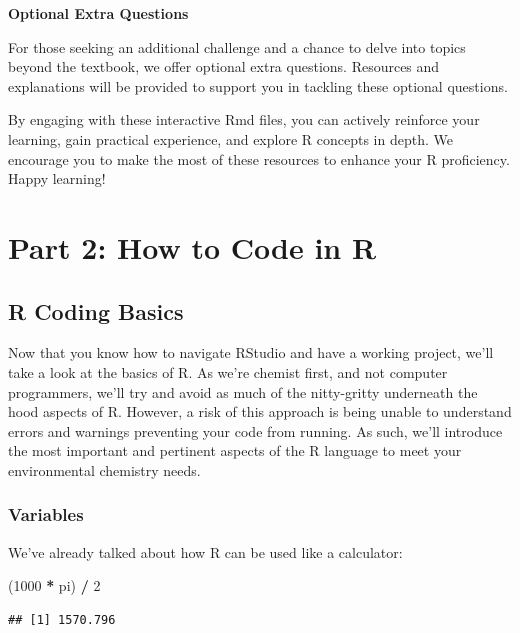 \documentclass[
]{book}
\newenvironment{Shaded}{\begin{snugshade}}{\end{snugshade}}
\newcommand{\DecValTok}[1]{\textcolor[rgb]{0.00,0.00,0.81}{#1}}
\newcommand{\NormalTok}[1]{#1}
\newcommand{\SpecialCharTok}[1]{\textcolor[rgb]{0.81,0.36,0.00}{\textbf{#1}}}
\begin{document}
\textbf{Optional Extra Questions}

For those seeking an additional challenge and a chance to delve into topics beyond the textbook, we offer optional extra questions. Resources and explanations will be provided to support you in tackling these optional questions.

By engaging with these interactive Rmd files, you can actively reinforce your learning, gain practical experience, and explore R concepts in depth. We encourage you to make the most of these resources to enhance your R proficiency. Happy learning!

\hypertarget{part-part-2-how-to-code-in-r}{%
\part*{Part 2: How to Code in R}\label{part-part-2-how-to-code-in-r}}

\hypertarget{r-coding-basics}{%
\chapter{R Coding Basics}\label{r-coding-basics}}

Now that you know how to navigate RStudio and have a working project, we'll take a look at the basics of R. As we're chemist first, and not computer programmers, we'll try and avoid as much of the nitty-gritty underneath the hood aspects of R. However, a risk of this approach is being unable to understand errors and warnings preventing your code from running. As such, we'll introduce the most important and pertinent aspects of the R language to meet your environmental chemistry needs.

\hypertarget{variables}{%
\section{Variables}\label{variables}}

We've already talked about how R can be used like a calculator:

\begin{Shaded}
\begin{Highlighting}[]
\NormalTok{(}\DecValTok{1000} \SpecialCharTok{*}\NormalTok{ pi) }\SpecialCharTok{/} \DecValTok{2}
\end{Highlighting}
\end{Shaded}

\begin{verbatim}
## [1] 1570.796
\end{verbatim}
\end{document}
